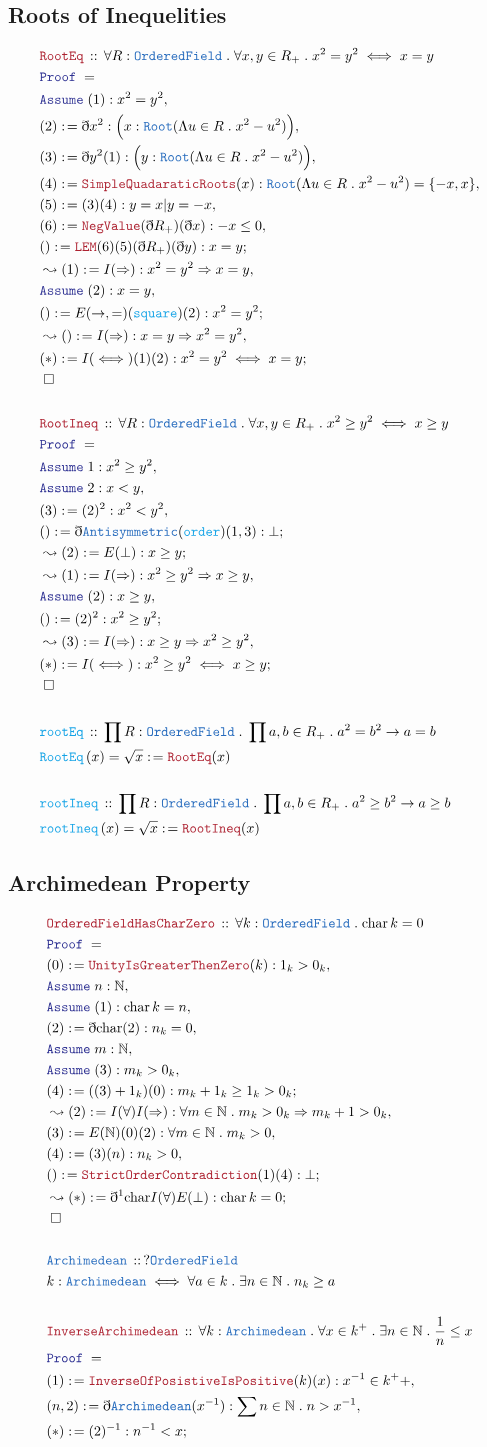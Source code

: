 \documentclass[12pt]{scrartcl}
\newcommand{\TYPE}[1]{\textcolor{NavyBlue}{\mathtt{#1}}}
\newcommand{\FUNC}[1]{\textcolor{Cerulean}{\mathtt{#1}}}
\newcommand{\LOGIC}[1]{\textcolor{Blue}{\mathtt{#1}}}
\newcommand{\THM}[1]{\textcolor{Maroon}{\mathtt{#1}}}
\renewcommand{\.}{\; . \;}
\newcommand{\de}{: \kern 0.1pc =}
\newcommand{\Act}[1]{\left( #1 \right)}
\newcommand{\Theorem}[2]{& \THM{#1} \, :: \, #2 \\ & \Proof = \\ }
\newcommand{\DeclareType}[2]{& \TYPE{#1} \, :: \, #2 \\}
\newcommand{\DefineType}[3]{& #1 : \TYPE{#2} \iff #3 \\}
\newcommand{\DeclareFunc}[2]{& \FUNC{#1} \, :: \, #2 \\}
\newcommand{\DefineNamedFunc}[4]{&  \FUNC{#1}\Act{#2} = #3 \de #4 \\}
\newcommand{\Page}[1]{ \begin{align*} #1 \end{align*}   }
\newcommand{ \bd }{ \ByDef }
\newcommand{\Nat}{\mathbb{N} }
\newcommand{\Say}[3]{& #1 \de #2 : #3, \\}
\newcommand{\Conclude}[3]{& #1 \de #2 : #3; \\}
\newcommand{\Derive}[3]{& \leadsto #1 \de #2 : #3, \\}
\newcommand{\DeriveConclude}[3]{& \leadsto #1 \de #2 : #3 ; \\}
\newcommand{\A}{\LOGIC{Assume} \;}
\newcommand{\Assume}[2]{& \A #1 : #2, \\}
\newcommand{\QED}{\; \square}
\newcommand{\EndProof}{& \QED \\}
\newcommand{\ByDef}{\eth}
\newcommand{\Proof}{\LOGIC{Proof} \; }
\newcommand{\OF}{\TYPE{OrderedField}}
\begin{document}
\subsection{Roots of Inequelities}
\Page{
	\Theorem{RootEq}{\forall R : \OF \. \forall x,y \in R_+ \. x^2 = y^2 \iff x = y}
	\Assume{(1)}{x^2 = y^2}
	\Say{(2)}{ \bd x^2  }{\Big(x : \TYPE{Root}(\Lambda u \in R \. x^2 - u^2)\Big)}
	\Say{(3)}{\bd y^2(1)}{\Big(y : \TYPE{Root}(\Lambda u \in R \. x^2 - u^2)\Big)}
	\Say{(4)}{\THM{SimpleQuadaraticRoots}(x)}{ \TYPE{Root}(\Lambda u \in R \. x^2 - u^2) = \{ -x,x\} }
	\Say{(5)}{ (3)(4)   }{ y = x | y = -x}
	\Say{(6)}{\THM{NegValue}(\bd R_+)(\bd x )}{ -x \le 0 }
	\Conclude{()}{\THM{LEM}(6)(5)(\bd R_+)(\bd y) }{ x = y}
	\Derive{(1)}{I(\Rightarrow)}{ x^2 = y^2 \Rightarrow x = y }
	\Assume{(2)}{x = y}
	\Conclude{()}{E(\to,=)(\FUNC{square})(2)}{x^2 = y^2 }
	\Derive{()}{I(\Rightarrow)}{x = y \Rightarrow x^2 = y^2}
	\Conclude{(*)}{I(\iff)(1)(2)}{x^2 = y^2 \iff x = y}
	\EndProof
	\\
	\Theorem{RootIneq}{\forall R : \OF \. \forall x,y \in R_+ \. x^2 \ge y^2 \iff x \ge y}
	\Assume{1}{x^2 \ge y^2}
	\Assume{2}{x < y}
	\Say{(3)}{(2)^2}{x^2 < y^2}
	\Conclude{()}{\bd \TYPE{Antisymmetric}(\FUNC{order})(1,3)}{\bot }
	\DeriveConclude{(2)}{E(\bot)}{x \ge y}
	\Derive{(1)}{I(\Rightarrow)}{x^2 \ge  y^2 \Rightarrow x \ge y}
	\Assume{(2)}{x \ge y}
	\Conclude{()}{(2)^2}{x^2 \ge y^2}
	\Derive{(3)}{I(\Rightarrow)}{x \ge y \Rightarrow x^2 \ge y^2}
	\Conclude{(*)}{I(\iff)}{x^2 \ge y^2 \iff x \ge y}
	\EndProof
	\\
	\DeclareFunc{rootEq}{\prod R : \OF \. \prod a,b \in R_+ \. a^2 = b^2 \to a = b}
	\DefineNamedFunc{RootEq}{x}{\sqrt{x}}{\THM{RootEq}(x) }
	\\
	\DeclareFunc{rootIneq}{\prod R : \OF \. \prod a,b \in R_+ \. a^2 \ge b^2 \to a \ge b}
	\DefineNamedFunc{rootIneq}{x}{\sqrt{x}}{\THM{RootIneq}(x)}
}
\subsection{Archimedean Property}
\Page{
\Theorem{OrderedFieldHasCharZero}{\forall k : \OF \. \mathrm{char} \, k = 0}
\Say{(0)}{\THM{UnityIsGreaterThenZero}(k)}{ 1_k > 0_k }
\Assume{n}{\Nat}
\Assume{(1)}{\mathrm{char} \, k = n}
\Say{(2)}{\bd \mathrm{char} (2) }{  n_k = 0   }
\Assume{m}{\Nat}
\Assume{(3)}{  m_k > 0_k}
\Conclude{(4)}{ ((3) + 1_k)(0) }{ m_k + 1_k \ge 1_k > 0_k }
\Derive{(2)}{ I(\forall)I(\Rightarrow)}{ \forall m \in \Nat \.  m_k  > 0_k \Rightarrow m_k +1 > 0_k }
\Say{(3)}{ E(\Nat)(0)(2)}{ \forall m \in \Nat \. m_k > 0}
\Say{(4)}{(3)(n)}{n_k > 0}
\Conclude{()}{\THM{StrictOrderContradiction}(1)(4)}{\bot}
\DeriveConclude{(*)}{\bd^1 \mathrm{char} I(\forall) E(\bot) }{ \mathrm{char} \, k = 0}
\EndProof
\\
\DeclareType{Archimedean}{ ? \OF}
\DefineType{k}{Archimedean}{ \forall a  \in k \. \exists n \in \Nat \. n_k \ge a}
\\
\Theorem{InverseArchimedean}{ \forall k : \TYPE{Archimedean} \. \forall x \in k^+ \. \exists n \in \Nat \.  \frac{1}{n} \le  x  }
\Say{(1)}{\THM{InverseOfPosistiveIsPositive}(k)(x)}{x^{-1} \in k^++}
\Say{(n,2)}{\bd \TYPE{Archimedean}(x^{-1})}{ \sum n \in \Nat \. n > x^{-1}  }
\Conclude{(*)}{ (2)^{-1}}{ n^{-1} < x }
}
\newpage
\end{document}
